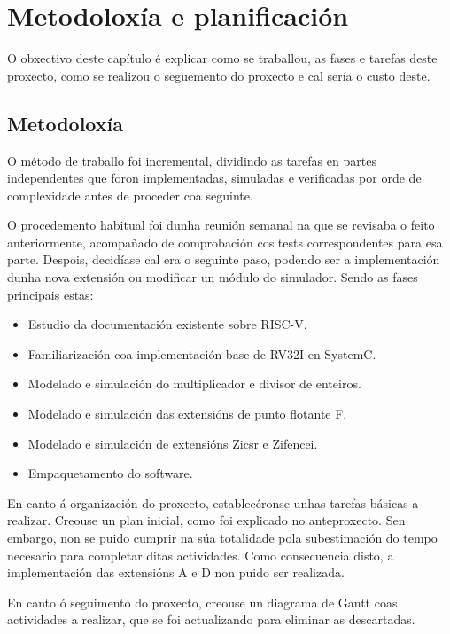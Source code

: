 \chapter{Metodoloxía e planificación}
\label{chap:metodoloxia_plan}


\lettrine{O}{} obxectivo deste capítulo é explicar como se traballou, as fases e tarefas deste proxecto, como se realizou o seguemento do proxecto e cal sería o custo deste.


\section{Metodoloxía}
\label{sec:metodoloxía}
O método de traballo foi incremental, dividindo as tarefas en partes independentes que foron implementadas, simuladas e verificadas por orde de complexidade antes de proceder coa seguinte.

O procedemento habitual foi dunha reunión semanal na que se revisaba o feito anteriormente, acompañado de comprobación cos tests correspondentes para esa parte. Despois, decidíase cal era o seguinte paso, podendo ser a implementación dunha nova extensión ou modificar un módulo do simulador. Sendo as fases principais estas:

\begin{itemize}
    \item Estudio da documentación existente sobre RISC-V.
    \item Familiarización coa implementación base de RV32I en SystemC. 
    \item Modelado e simulación do multiplicador e divisor de enteiros. 
    \item Modelado e simulación das extensións de punto flotante F. 
    \item Modelado e simulación de extensións Zicsr e  Zifencei.
    \item Empaquetamento do software. 

\end{itemize}

En canto á organización do proxecto, establecéronse unhas tarefas básicas a realizar. Creouse un plan inicial, como foi explicado no anteproxecto. Sen embargo, non se puido cumprir na súa totalidade pola subestimación do tempo necesario para completar ditas actividades. Como consecuencia disto, a implementación das extensións A e D non puido ser realizada. 

En canto ó seguimento do proxecto, creouse un diagrama de Gantt coas actividades a realizar, que se foi actualizando para eliminar as descartadas. 

